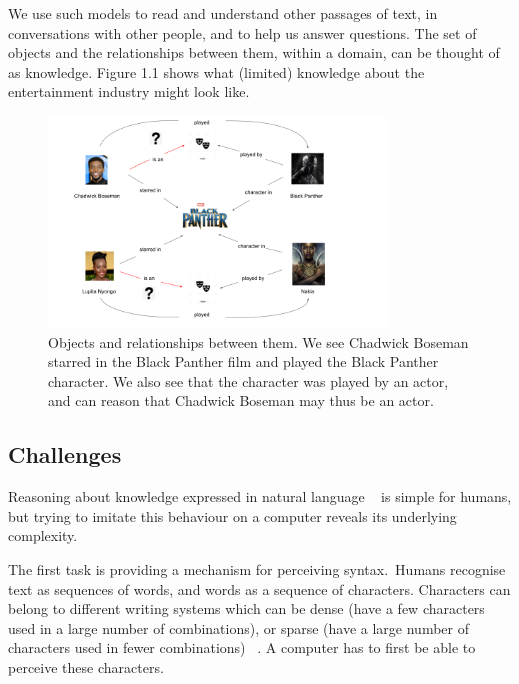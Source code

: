 \noindent We use such models to read and understand other passages of text, in conversations with other people, and to help us answer questions. The set of objects and the relationships between them, within a domain, can be thought of as knowledge. Figure 1.1 shows what (limited) knowledge about the entertainment industry might look like. 

\begin{figure} [H]
   	\centering
    	\includegraphics[width=0.8\textwidth, height=0.4\textheight]{Entities_and_the_Relationships_Between_Them}
	\captionsetup{justification=centering}
	\caption{Objects and relationships between them. We see Chadwick Boseman starred in the Black Panther film and played the Black Panther character. We also see that the character was played by an actor, and can reason that Chadwick Boseman may thus be an actor.}
\end{figure}

\subsection{Challenges} 

Reasoning about knowledge expressed in natural language \unskip~\citep{minervini2019differentiable} is simple for humans, but trying to imitate this behaviour on a computer reveals its underlying complexity. \par

\noindent The first task is providing a mechanism for perceiving syntax.\ Humans recognise text as sequences of words, and words as a sequence of characters. Characters can belong to different writing systems which can be dense (have a few characters used in a large number of combinations), or sparse (have a large number of characters used in fewer combinations) \unskip~\citep{Hua2010}. A computer has to first be able to perceive these characters. \par

